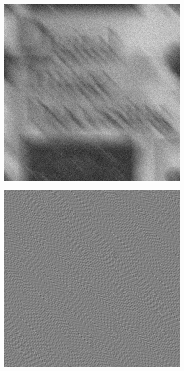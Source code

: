 \begin{figure}[h]
	\centering
	\begin{subfigure}[b]{0.3\linewidth}
		\includegraphics[width=\linewidth]{myfigure/p5/5_blur_gaussian_650.png}
		\caption{}
		\label{fig:5_gaussian_650}
	\end{subfigure}
  	\begin{subfigure}[b]{0.3\linewidth}
		\includegraphics[width=\linewidth]{myfigure/p5/5_inverse_650.png}

\end{subfigure}
\end{figure}
